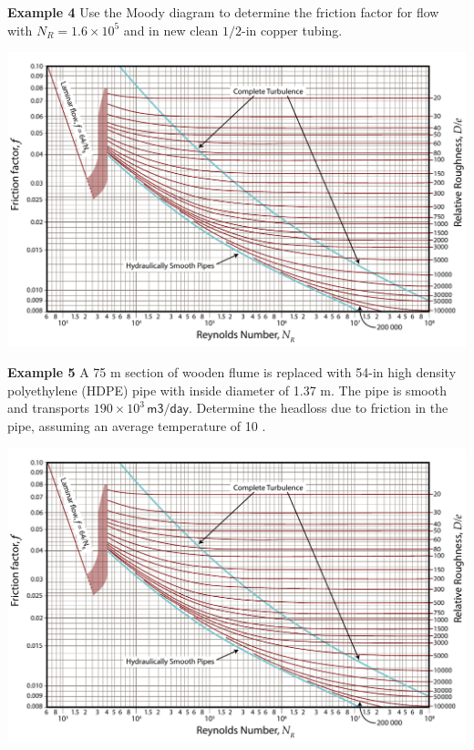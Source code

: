 \documentclass[10pt]{amsart}
\begin{document}
	
	\newpage
	
	
	\textbf{Example 4}	
	Use the Moody diagram to determine the friction factor for flow with $N_R=1.6\times 10^5$ and in new clean
	$1/2$-in copper tubing.\par\medskip
	
	\begin{center}
		\includegraphics[scale=1.1, angle=90]{../../figs/05FrictionLosses/moody.pdf}
	\end{center}
	
	
	\newpage
	
	
	\textbf{Example 5}
	A 75 m section of wooden flume is replaced with 54-in high
density polyethylene (HDPE) pipe with inside diameter of
1.37 m. The pipe is smooth and transports $ 190 \times 10^3\mathsf{\, m3/day}$.
Determine the headloss due to friction in the pipe, assuming
an average temperature of 10 \textcelsius.\par\medskip
	
	\begin{center}
		\includegraphics[scale=1.1, angle=90]{../../figs/05FrictionLosses/moody.pdf}
	\end{center}
	
\end{document}
